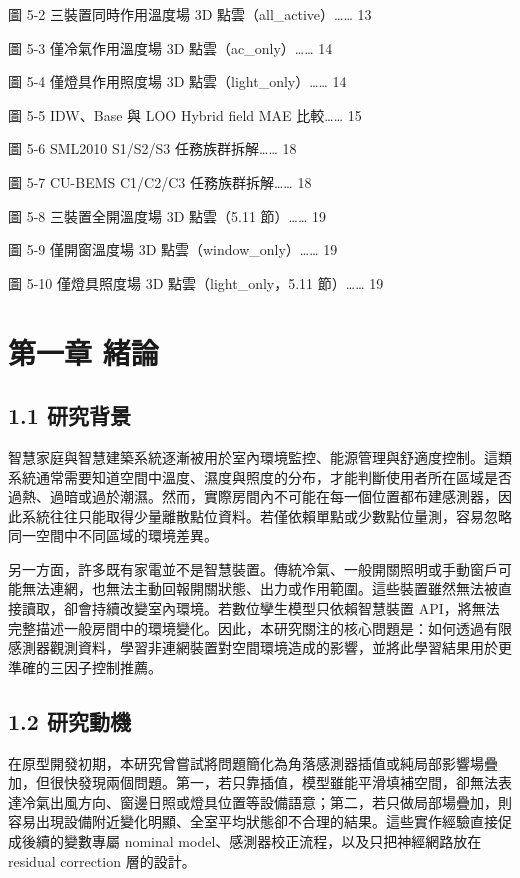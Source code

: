\documentclass[12pt,a4paper]{article}
\begin{document}
圖 5-2 三裝置同時作用溫度場 3D 點雲（all\_\allowbreak{}active）…… 13


圖 5-3 僅冷氣作用溫度場 3D 點雲（ac\_\allowbreak{}only）…… 14


圖 5-4 僅燈具作用照度場 3D 點雲（light\_\allowbreak{}only）…… 14


圖 5-5 IDW、Base 與 LOO Hybrid field MAE 比較…… 15


圖 5-6 SML2010 S1/S2/S3 任務族群拆解…… 18


圖 5-7 CU-BEMS C1/C2/C3 任務族群拆解…… 18


圖 5-8 三裝置全開溫度場 3D 點雲（5.11 節）…… 19


圖 5-9 僅開窗溫度場 3D 點雲（window\_\allowbreak{}only）…… 19


圖 5-10 僅燈具照度場 3D 點雲（light\_\allowbreak{}only，5.11 節）…… 19


\clearpage

\clearpage{}

\section*{第一章 緒論}

\subsection*{1.1 研究背景}

智慧家庭與智慧建築系統逐漸被用於室內環境監控、能源管理與舒適度控制。這類系統通常需要知道空間中溫度、濕度與照度的分布，才能判斷使用者所在區域是否過熱、過暗或過於潮濕。然而，實際房間內不可能在每一個位置都布建感測器，因此系統往往只能取得少量離散點位資料。若僅依賴單點或少數點位量測，容易忽略同一空間中不同區域的環境差異。


另一方面，許多既有家電並不是智慧裝置。傳統冷氣、一般開關照明或手動窗戶可能無法連網，也無法主動回報開關狀態、出力或作用範圍。這些裝置雖然無法被直接讀取，卻會持續改變室內環境。若數位孿生模型只依賴智慧裝置 API，將無法完整描述一般房間中的環境變化。因此，本研究關注的核心問題是：如何透過有限感測器觀測資料，學習非連網裝置對空間環境造成的影響，並將此學習結果用於更準確的三因子控制推薦。


\subsection*{1.2 研究動機}

在原型開發初期，本研究曾嘗試將問題簡化為角落感測器插值或純局部影響場疊加，但很快發現兩個問題。第一，若只靠插值，模型雖能平滑填補空間，卻無法表達冷氣出風方向、窗邊日照或燈具位置等設備語意；第二，若只做局部場疊加，則容易出現設備附近變化明顯、全室平均狀態卻不合理的結果。這些實作經驗直接促成後續的變數專屬 nominal model、感測器校正流程，以及只把神經網路放在 residual correction 層的設計。
\end{document}
